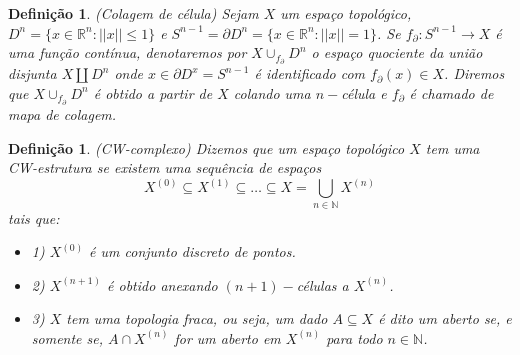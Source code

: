 \documentclass{beamer}
\newtheorem{definicao}[teorema]{Definição}
\newcommand{\skeleton}[1]{X^{(#1)}}
\begin{document}
\begin{frame}
	\begin{definicao}
		(Colagem de célula) Sejam $X$ um espaço topológico, $D^{n}=\{x\in \mathbb{R}^{n} : ||x|| \leq 1\}$ e $S^{n-1} = \partial D^{n}=\{x\in \mathbb{R}^{n} : ||x|| = 1\}$. Se $f_{\partial}:S^{n-1} \to X$ é uma função contínua, denotaremos por $X\cup_{f_{\partial}}D^{n}$ o espaço quociente da união disjunta $X \coprod D^{n}$ onde $x \in \partial D^{x} = S^{n-1}$ é identificado com $f_{\partial}(x) \in X$. Diremos que $X\cup_{f_{\partial}}D^{n}$ é obtido a partir de $X$ colando uma $n-$célula e $f_{\partial}$ é chamado de mapa de colagem.
	\end{definicao}
\end{frame}

\begin{frame}
	
	\begin{definicao}
		(CW-complexo) Dizemos que um espaço topológico $X$ tem uma CW-estrutura se existem uma sequência de espaços
		$$
		\skeleton{0} \subseteq \skeleton{1} \subseteq \dots \subseteq X = \bigcup \limits_{n\in \mathbb{N}} \skeleton{n}
		$$ 
		tais que:
		\begin{itemize}
			\item 1) $\skeleton{0}$ é um conjunto discreto de pontos.
			
			\item 2) $\skeleton{n+1}$ é obtido anexando $(n+1)-$células a $\skeleton{n}$.
			
			\item 3) $X$ tem uma topologia fraca, ou seja, um dado $A \subseteq X$ é dito um aberto se, e somente se, $A \cap \skeleton{n}$ for um aberto em $\skeleton{n}$ para todo $n \in \mathbb{N}$.
		\end{itemize}
	\end{definicao}
\end{frame}
\end{document}
